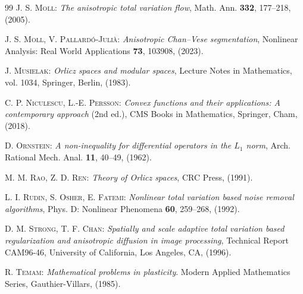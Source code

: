 \documentclass[a4paper,11pt,oneside,notitlepage]{article}
\numberwithin{equation}{section}
\begin{document}
\begin{thebibliography}{99}
 \textsc{J. S. Moll:} \emph{The anisotropic total variation flow}, Math. Ann. {\bf 332}, 177--218, (2005).

 \textsc{J. S. Moll, V. Pallard\'o-Juli\`a:} \emph{Anisotropic Chan–Vese segmentation}, Nonlinear Analysis: Real World Applications {\bf 73}, 103908, (2023).

 \textsc{J. Musielak:} \emph{Orlicz spaces and modular spaces}, Lecture Notes in Mathematics, vol. 1034, Springer, Berlin, (1983).

 \textsc{C. P. Niculescu, L.-E. Persson:} \emph{Convex functions and their applications: A contemporary approach} (2nd ed.), CMS Books in Mathematics, Springer, Cham, (2018).

 \textsc{D. Ornstein:} \emph{A non-inequality for differential operators in the $L_1$ norm}, Arch. Rational Mech. Anal. {\bf 11}, 40--49, (1962).

 \textsc{M. M. Rao, Z. D. Ren:} \emph{Theory of Orlicz spaces}, CRC Press, (1991).

 \textsc{L. I. Rudin, S. Osher, E. Fatemi:} \emph{Nonlinear total variation based noise removal algorithms}, Phys. D: Nonlinear Phenomena {\bf 60}, 259--268, (1992).

 \textsc{D. M. Strong, T. F. Chan:} \emph{Spatially and scale adaptive total variation based regularization and anisotropic diffusion in image processing}, Technical Report CAM96-46, University of California, Los Angeles, CA, (1996).

 \textsc{R. Temam:} \emph{Mathematical problems in plasticity}. Modern Applied Mathematics Series, Gauthier-Villars, (1985).
 
\end{thebibliography}
\end{document}
